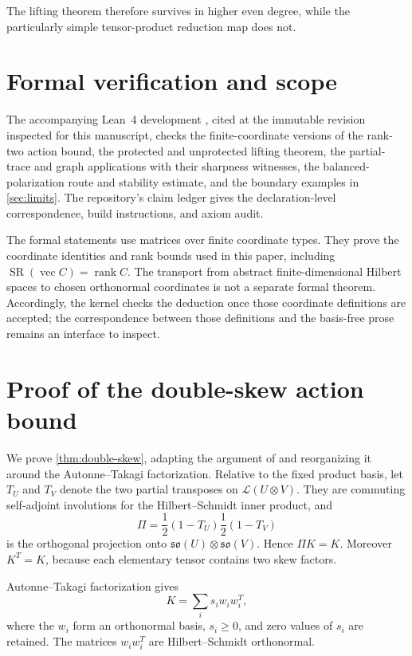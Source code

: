 \documentclass[11pt,reqno]{amsart}
\theoremstyle{remark}
\DeclareMathOperator{\rank}{rank}
\DeclareMathOperator{\SR}{SR}
\newcommand{\cL}{\mathcal L}
\newcommand{\vecop}{\operatorname{vec}}
\begin{document}
The lifting theorem therefore survives in higher even degree, while the
particularly simple tensor-product reduction map does not.

\section{Formal verification and scope}
\label{sec:formal}

The accompanying Lean~4 development
\cite{RankRRepository}, cited at the immutable revision inspected for this
manuscript, checks the finite-coordinate versions of the rank-two action
bound, the protected and unprotected lifting theorem, the partial-trace and
graph applications with their sharpness witnesses, the balanced-polarization
route and stability estimate, and the boundary examples in
\cref{sec:limits}.  The repository's claim ledger gives the declaration-level
correspondence, build instructions, and axiom audit.

The formal statements use matrices over finite coordinate types.
They prove the coordinate identities and rank bounds used in this paper,
including $\SR(\vecop C)=\rank C$.  The transport from abstract
finite-dimensional Hilbert spaces to chosen orthonormal coordinates is not a
separate formal theorem.  Accordingly, the kernel checks the deduction once
those coordinate definitions are accepted; the correspondence between those
definitions and the basis-free prose remains an interface to inspect.

\appendix

\section{Proof of the double-skew action bound}
\label{app:double-skew}

We prove \cref{thm:double-skew}, adapting the argument of
\cite[\S2]{FuGaoPark2026} and reorganizing it around the Autonne--Takagi
factorization.  Relative to the fixed product basis, let
$T_U$ and $T_V$ denote the two partial transposes on
$\cL(U\otimes V)$.  They are commuting self-adjoint involutions for the
Hilbert--Schmidt inner product, and
\[
  \Pi=\frac12(1-T_U)\frac12(1-T_V)
\]
is the orthogonal projection onto
$\mathfrak{so}(U)\otimes\mathfrak{so}(V)$.  Hence $\Pi K=K$.
Moreover $K^T=K$, because each elementary tensor contains two skew factors.

Autonne--Takagi factorization \cite[Cor.~4.4.4(c)]{HornJohnson} gives
\begin{equation}
\label{eq:takagi}
  K=\sum_i s_iw_iw_i^T,
\end{equation}
where the $w_i$ form an orthonormal basis, $s_i\ge0$, and zero values of
$s_i$ are retained.  The matrices $w_iw_i^T$ are Hilbert--Schmidt
orthonormal.
\end{document}
